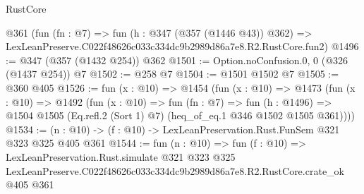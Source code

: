\begin{lexlean}{RustCore}
\begin{coremodule}
    @361
    (fun (fn : @7) =>
    fun (h : @347 (@357 (@1446 @43)) @362) =>
    LexLeanPreserve.C022f48626c033c334dc9b2989d86a7e8.R2.RustCore.fun2)
@1496 := @347 (@357 (@1432 @254)) @362
@1501 := Option.noConfusion.{0, 0} (@326 (@1437 @254)) @7
@1502 := @258 @7
@1504 := @1501 @1502 @7
@1505 := @360 @405
@1526 := fun (x : @10) =>
  @1454
    (fun (x : @10) =>
    @1473
      (fun (x : @10) =>
      @1492
        (fun (x : @10) =>
        fun (fn : @7) =>
        fun (h : @1496) =>
        @1504 @1505 (Eq.refl.{2} (Sort 1) @7) (heq_of_eq.{1} @346 @1502 @1505 @361))))
@1534 := (n : @10) -> (f : @10) -> LexLeanPreservation.Rust.FunSem @321 @323 @325 @405 @361
@1544 := fun (n : @10) =>
  fun (f : @10) =>
  LexLeanPreservation.Rust.simulate
    @321
    @323
    @325
    LexLeanPreserve.C022f48626c033c334dc9b2989d86a7e8.R2.RustCore.crate_ok
    @405
    @361
\end{coremodule}
\end{lexlean}
